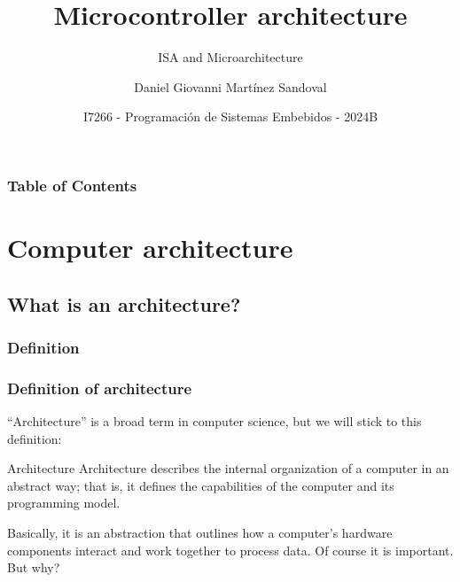 \documentclass[aspectratio=169]{beamer}
\title[Microcontroller architecture] %
{Microcontroller architecture}
\subtitle{ISA and Microarchitecture}
\author{Daniel Giovanni Martínez Sandoval}
\institute[CUCEI - UDG]
{
  \textsc{
    \textbf{Universidad de Guadalajara}\\
    {\tiny Centro Universitario de Ciencias Exactas e Ingenierías}
  }
}
\date[September 2024] %
{\footnotesize I7266 - Programación de Sistemas Embebidos - 2024B }
\begin{document}
\frame{\titlepage}


\begin{frame}
\frametitle{Table of Contents}
\tableofcontents
\end{frame}


\section{Computer architecture}
\subsection{What is an architecture?}
\subsubsection{Definition}
\begin{frame}
  \frametitle{Definition of architecture}
  ``Architecture'' is a broad term in computer science, but we will stick to this definition: \pause
  \begin{block}{Architecture}
    Architecture describes the internal organization of a computer in an abstract way; that is, it deﬁnes the capabilities of the computer and its programming model.\cite{clements} \pause
  \end{block}
  Basically, it is an abstraction that outlines how a computer's hardware components interact and work together to process data. Of course it is important. But why?
  \end{frame}
\end{document}
